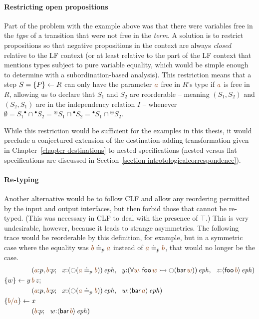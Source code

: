 \paragraph{Restricting open propositions} Part of the problem with the
example above was that there were variables free in the {\it type} of
a transition that were not free in the {\it term}.  A solution is to
restrict propositions so that negative propositions in the context are
always {\it closed} relative to the LF context (or at least relative
to the part of the LF context that mentions types subject to pure
variable equality, which would be simple enough to determine with a
subordination-based analysis). This restriction means that a step $S =
\{{P}\} \leftarrow {R}$ can only have the parameter $\lf{a}$ free in $R$'s type
if $\lf{a}$ is free in $R$, allowing us to declare that $S_1$ and
$S_2$ are reorderable -- meaning $(S_1,S_2)$ and $(S_2,S_1)$ are in the
independency relation $I$ -- whenever
$\emptyset = S_1{^\bullet} \cap {^\bullet}S_2 = {^\circledast}S_1 \cap
{^\bullet}S_2 = {^\bullet}S_1 \cap {^\circledast}S_2$. 

While this
restriction would be sufficient for the examples in this thesis, it
would preclude a conjectured extension of the destination-adding
transformation given in Chapter~\ref{chapter-destinations} to nested
specifications (nested versus flat specifications are discussed in
Section~\ref{section-introtologicalcorrespondence}).

\paragraph{Re-typing}
Another alternative would be to follow CLF and allow
any reordering permitted by the input and output interfaces, but then
forbid those that cannot be re-typed. (This was necessary in CLF to
deal with the presence of $\top$.) This is very undesirable, however, 
because it leads to strange asymmetries. The following trace would be 
reorderable by this definition, for example, but in a symmetric case where
the equality was $\lf{b} \doteq_p \lf{a}$ instead of  
$\lf{a} \doteq_p \lf{b}$, that would no longer be the case.
\begin{align*}
& \qquad\qquad
(\lf{a}{:}p, \lf{b}{:}p; ~~ x{:}\iseph{\left({\ocircle}(\lf{a} \doteq_p \lf{b})\right)}, ~~
 y{:}\iseph{\left(\forall \lf{w}.\,{\sf foo}\,\lf{w} 
                 \lefti {\ocircle}({\sf bar}\, \lf{w})\right)}, ~~
 z{:}\iseph{\susp{{\sf foo}\,\lf{b}}})
\\
& \trstep{w}{y\,\lf{b}\,z};
\\
& \qquad\qquad
(\lf{a}{:}p, \lf{b}{:}p; ~~ x{:}\iseph{\left({\ocircle}(\lf{a} \doteq_p \lf{b})\right)}, ~~
 w{:}\iseph{\susp{{\sf bar}\,\lf{a}}})
\\
& \trstep{\lf{b/a}}{x}
\\
& \qquad\qquad
(\lf{b}{:}p; ~~ w{:}\iseph{\susp{{\sf bar}\,\lf{b}}})
\end{align*}

